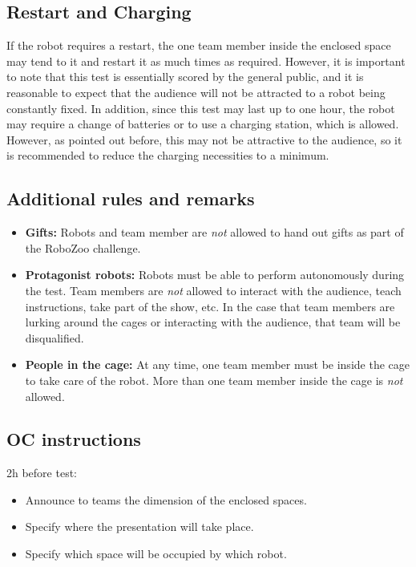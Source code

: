 \subsection{Restart and Charging}
If the robot requires a restart, the one team member inside the enclosed space may tend to it and restart it as much times as required. However, it is important to note that this test is essentially scored by the general public, and it is reasonable to expect that the audience will not be attracted to a robot being constantly fixed. In addition, since this test may last up to one hour, the robot may require a change of batteries or to use a charging station, which is allowed. However, as pointed out before, this may not be attractive to the audience, so it is recommended to reduce the charging necessities to a minimum. 

\subsection{Additional rules and remarks}

\begin{itemize}
\item \textbf{Gifts:} Robots and team member are \emph{not} allowed to hand out gifts as part of the RoboZoo challenge. 
\item \textbf{Protagonist robots:} Robots must be able to perform autonomously during the test. Team members are \emph{not} allowed to interact with the audience, teach instructions, take part of the show, etc. In the case that team members are lurking around the cages or interacting with the audience, that team will be disqualified.
\item \textbf{People in the cage:} At any time, one team member must be inside the cage to take care of the robot. More than one team member inside the cage is \emph{not} allowed.
\end{itemize}

\subsection{OC instructions}

2h before test:
\begin{itemize}
\item{Announce to teams the dimension of the enclosed spaces.}
\item{Specify where the presentation will take place.}
\item{Specify which space will be occupied by which robot.}
\end{itemize}

